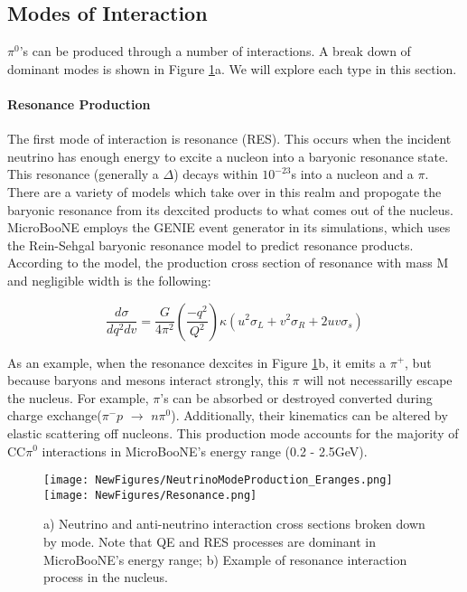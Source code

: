 \documentclass[12pt]{article}
\begin{document}
\subsection{ Modes of Interaction} 
$\pi^0$'s can be produced through a number of interactions. A break down of dominant modes is shown in Figure \ref{fig:res_and_numodes}a. We will explore each type in this section.
\paragraph {Resonance Production} The first mode of interaction is resonance (RES).  This occurs when the incident neutrino has enough energy to excite a nucleon into a baryonic resonance state. This resonance (generally a $\Delta$) decays within $10^{-23}$s into a nucleon and a $\pi$. There are a variety of models which take over in this realm and propogate the baryonic resonance from its dexcited products to what comes out of the nucleus. MicroBooNE employs the GENIE event generator \cite{bib:genie} in its simulations, which uses the Rein-Sehgal baryonic resonance model \cite{bib:rein_sehgal} to predict resonance products.  According to the model, the production cross section of resonance with mass M and negligible width is the following:

\begin{equation}
  \frac{d\sigma}{dq^2dv} = \frac{G}{4\pi^2} (\frac{-q^2}{Q^2}) \kappa (u^2\sigma_L+v^2\sigma_R + 2uv\sigma_s)
\end{equation}


\noindent As an example, when the resonance dexcites in Figure \ref{fig:res_and_numodes}b, it emits a $\pi^+$, but because baryons and mesons interact strongly, this $\pi$ will not necessarilly escape the nucleus. For example, $\pi$'s can be absorbed or destroyed converted during charge exchange($\pi^- p$ $\rightarrow$ $n \pi^0$). Additionally, their kinematics can be altered by elastic scattering off nucleons.  This production mode accounts for the majority of CC$\pi^0$ interactions in MicroBooNE's energy range (0.2 - 2.5GeV).

\begin{figure}[h!]
\centering
\texttt{[image: NewFigures/NeutrinoModeProduction\_Eranges.png]}
\hspace{6 mm}
\texttt{[image: NewFigures/Resonance.png]}
\caption{a) Neutrino and anti-neutrino interaction cross sections broken down by mode. Note that QE and RES processes are dominant in MicroBooNE's energy range; b) Example of resonance interaction process in the nucleus. }
\label{fig:res_and_numodes}
\end{figure}
\end{document}

